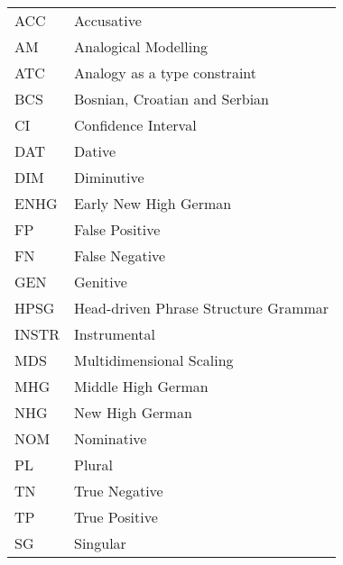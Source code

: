 \addchap{\lsAbbreviationsTitle}

\begin{tabularx}{\textwidth}{lQ}
    ACC   & Accusative                           \\
    AM    & Analogical Modelling                 \\
    ATC   & Analogy as a type constraint         \\
    BCS   & Bosnian, Croatian and Serbian        \\
    CI    & Confidence Interval                  \\
    DAT   & Dative                               \\
    DIM   & Diminutive                           \\
    ENHG  & Early New High German                \\
    FP    & False Positive                       \\
    FN    & False Negative                       \\
    GEN   & Genitive                             \\
    HPSG  & Head-driven Phrase Structure Grammar \\
    INSTR & Instrumental                         \\
    MDS   & Multidimensional Scaling             \\
    MHG   & Middle High German                   \\
    NHG   & New High German                      \\
    NOM   & Nominative                           \\
    PL    & Plural                                \\
    TN    & True Negative                        \\
    TP    & True Positive                        \\
    SG    & Singular                              \\
\end{tabularx} 
